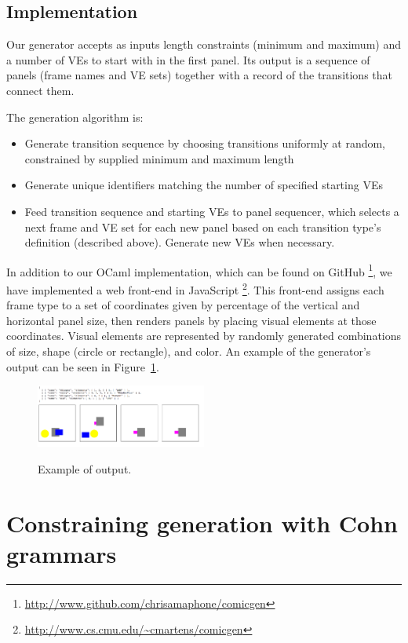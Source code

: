 \subsection{Implementation}

Our generator accepts as inputs length constraints (minimum and maximum)
and a number of VEs to start with in the first panel. Its output is a
sequence of panels (frame names and VE sets) together with a record of the
transitions that connect them.

The generation algorithm is:
\begin{itemize}
\item Generate transition sequence by choosing transitions uniformly at
random, constrained by supplied minimum and maximum length
\item Generate unique identifiers matching the number of specified starting
VEs
\item Feed transition sequence and starting VEs to panel sequencer, which
selects a next frame and VE set for each new panel based on each
transition type's definition (described above). Generate new VEs when
necessary.
\end{itemize}

In addition to our OCaml implementation, which can be found on
GitHub \footnote{\url{http://www.github.com/chrisamaphone/comicgen}}, we
have implemented a web front-end in JavaScript
\footnote{\url{http://www.cs.cmu.edu/~cmartens/comicgen}}. This front-end
assigns each frame type to a set of coordinates given by percentage of the
vertical and horizontal panel size, then renders panels by placing visual
elements at those coordinates. Visual elements are represented by randomly
generated combinations of size, shape (circle or rectangle), and color.
An example of the generator's output can be seen in Figure~\ref{fig:out1}.

\begin{figure}
\caption{Example of output.}
\includegraphics[width=0.5\textwidth]{comicgen-unconstrained-ok.png}
\label{fig:out1}
\end{figure}

\section{Constraining generation with Cohn grammars}

